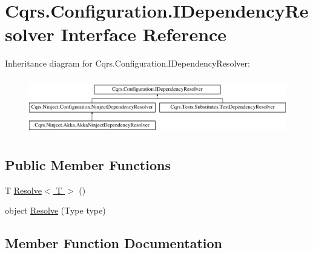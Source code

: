 \hypertarget{interfaceCqrs_1_1Configuration_1_1IDependencyResolver}{}\section{Cqrs.\+Configuration.\+I\+Dependency\+Resolver Interface Reference}
\label{interfaceCqrs_1_1Configuration_1_1IDependencyResolver}
Inheritance diagram for Cqrs.\+Configuration.\+I\+Dependency\+Resolver\+:\begin{figure}[H]
\begin{center}
\leavevmode
\includegraphics[height=2.514970cm]{interfaceCqrs_1_1Configuration_1_1IDependencyResolver}
\end{center}
\end{figure}
\subsection*{Public Member Functions}
\begin{DoxyCompactItemize}
\item 
T \hyperlink{interfaceCqrs_1_1Configuration_1_1IDependencyResolver_a9dc7694a365209a5ef05270a7cfa7b6b_a9dc7694a365209a5ef05270a7cfa7b6b}{Resolve$<$ T $>$} ()
\item 
object \hyperlink{interfaceCqrs_1_1Configuration_1_1IDependencyResolver_aa455096b7b94fc1d64904bc67830ec06_aa455096b7b94fc1d64904bc67830ec06}{Resolve} (Type type)
\end{DoxyCompactItemize}


\subsection{Member Function Documentation}
\mbox{\label{interfaceCqrs_1_1Configuration_1_1IDependencyResolver_aa455096b7b94fc1d64904bc67830ec06_aa455096b7b94fc1d64904bc67830ec06}} 
